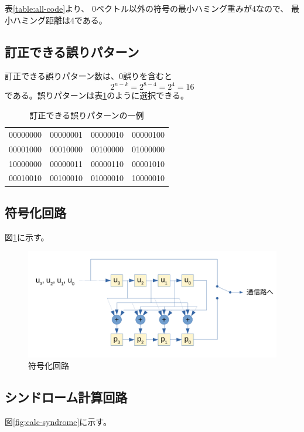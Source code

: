 \documentclass[a4paper,11pt]{jsarticle}
\begin{document}
表\ref{table:all-code}より、
0ベクトル以外の符号の最小ハミング重みが4なので、
最小ハミング距離は4である。

\subsection{訂正できる誤りパターン}
訂正できる誤りパターン数は、0誤りを含むと
\begin{equation*}
  2^{n-k}=2^{8-4}=2^4=16
\end{equation*}
である。誤りパターンは表\ref{table:error-pattern}のように選択できる。

\begin{table}[hbtp]
  \caption{訂正できる誤りパターンの一例}
  \label{table:error-pattern}
  \centering
  \begin{tabular}{cccc}
    00000000 & 00000001 & 00000010 & 00000100 \\
    00001000 & 00010000 & 00100000 & 01000000 \\
    10000000 & 00000011 & 00000110 & 00001010 \\
    00010010 & 00100010 & 01000010 & 10000010
  \end{tabular}
\end{table}

\subsection{符号化回路}
図\ref{fig:encoding-circuit}に示す。

\begin{figure}[htbp]
  \begin{center}
  \includegraphics[scale=0.7]{figures/circuit001.pdf}
  \end{center}
  \caption{符号化回路
  \label{fig:encoding-circuit}
  }
\end{figure}

\subsection{シンドローム計算回路}
図\ref{fig:calc-syndrome}に示す。
\end{document}
